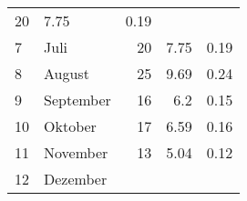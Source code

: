 \begin{longtable}{lXrrr}
       \num{20} &
       \num[round-mode=places,round-precision=2]{7,75} &
         \num[round-mode=places,round-precision=2]{0,19} \\

     7 &
     \multicolumn{1}{X}{ Juli   } &


       \num{20} &
       \num[round-mode=places,round-precision=2]{7,75} &
         \num[round-mode=places,round-precision=2]{0,19} \\

     8 &
     \multicolumn{1}{X}{ August   } &


       \num{25} &
       \num[round-mode=places,round-precision=2]{9,69} &
         \num[round-mode=places,round-precision=2]{0,24} \\

     9 &
     \multicolumn{1}{X}{ September   } &


       \num{16} &
       \num[round-mode=places,round-precision=2]{6,2} &
         \num[round-mode=places,round-precision=2]{0,15} \\

     10 &
     \multicolumn{1}{X}{ Oktober   } &


       \num{17} &
       \num[round-mode=places,round-precision=2]{6,59} &
         \num[round-mode=places,round-precision=2]{0,16} \\

     11 &
     \multicolumn{1}{X}{ November   } &


       \num{13} &
       \num[round-mode=places,round-precision=2]{5,04} &
         \num[round-mode=places,round-precision=2]{0,12} \\

     12 &
     \multicolumn{1}{X}{ Dezember   } &



\end{longtable}
